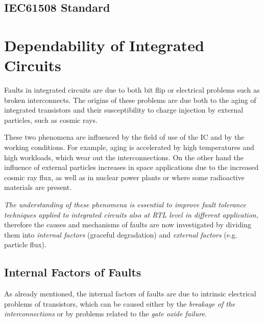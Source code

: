 {{		\subsection{IEC61508 Standard}{
		} %
	}%
	\newpage
	\section{Dependability of Integrated Circuits}{
		Faults in integrated circuits are due to both bit flip or electrical problems such as broken interconnects. The origins of these problems are due both to the aging of integrated transistors and their susceptibility to charge injection by external particles, such as cosmic rays.
		
		
		These two phenomena are influenced by the field of use of the IC and by the working conditions. For example, aging is accelerated by high temperatures and high workloads, which wear out the interconnections. On the other hand the influence of external particles increases in space applications due to the increased cosmic ray flux, as well as in nuclear power plants or where some radioactive materials are present.
		
		
		\textit{The understanding of these phenomena is essential to improve fault tolerance techniques applied to integrated circuits also at RTL level in different application}, therefore the causes and mechanisms of faults are now investigated by dividing them into \textit{internal factors} (graceful degradation) and \textit{external factors} (e.g. particle flux).
		
		\subsection{Internal Factors of Faults}{
			As already mentioned, the internal factors of faults are due to intrinsic electrical problems of transistors, which can be caused either by the \textit{breakage of the interconnections} or by problems related to the \textit{gate oxide failure}.
			
}}}
